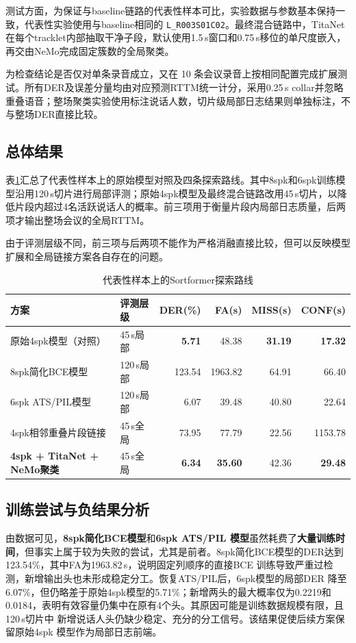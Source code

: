 \documentclass[UTF8,a4paper,10pt]{ctexart}
\begin{document}
测试方面，为保证与baseline链路的代表性样本可比，实验数据与参数基本保持一致，代表性实验使用与baseline相同的 \texttt{L\_R003S01C02}。最终混合链路中，TitaNet在每个tracklet内部抽取干净子段，默认使用1.5\,s窗口和0.75\,s移位的单尺度嵌入，再交由NeMo完成固定簇数的全局聚类。

为检查结论是否仅对单条录音成立，又在 10 条会议录音上按相同配置完成扩展测试。所有DER及误差分量均由对应预测RTTM统一计分，采用0.25\,s collar并忽略重叠语音；整场聚类实验使用标注说话人数，切片级局部日志结果则单独标注，不与整场DER直接比较。





\subsection{总体结果}

表\ref{tab:sortformer-paths}汇总了代表性样本上的原始模型对照及四条探索路线。其中8spk和6spk训练模型沿用120\,s切片进行局部评测；原始4spk模型及最终混合链路改用45\,s切片，以降低片段内超过4名活跃说话人的概率。前三项用于衡量片段内局部日志质量，后两项才输出整场会议的全局RTTM。

由于评测层级不同，前三项与后两项不能作为严格消融直接比较，但可以反映模型扩展和全局链接方案各自存在的问题。

\begin{table}[H]
\centering
\small
\caption{代表性样本上的Sortformer探索路线}
\label{tab:sortformer-paths}
\begin{tabular}{llrrrr}
\toprule
方案 & 评测层级 & DER(\%) & FA(s)& MISS(s)& CONF(s)\\
\midrule
原始4spk模型（对照） & 45\,s局部 & \textbf{5.71} & 48.38 & \textbf{31.19} & \textbf{17.32}\\
8spk简化BCE模型 & 120\,s局部 & 123.54 & 1963.82 & 64.91 & 66.40\\
6spk ATS/PIL模型 & 120\,s局部 & 6.07 & 39.48 & 40.80 & 22.64\\
4spk相邻重叠片段链接 & 45\,s全局 & 73.95 & 77.79 & 22.56 & 1153.78\\
\textbf{4spk + TitaNet + NeMo聚类} & 45\,s全局 & \textbf{6.34} & \textbf{35.60} & 42.36 & \textbf{29.48}\\
\bottomrule
\end{tabular}
\end{table}

\subsection{训练尝试与负结果分析}
由数据可见，\textbf{8spk简化BCE模型}和\textbf{6spk ATS/PIL 模型}虽然耗费了\textbf{大量训练时间}，但事实上属于较为失败的尝试，尤其是前者。8spk简化BCE模型的DER达到123.54\%，其中FA为1963.82\,s，说明固定列顺序的直接BCE
训练导致严重过检测，新增输出头也未形成稳定分工。恢复ATS/PIL后，6spk模型的局部DER
降至6.07\%，但仍略差于原始4spk模型的5.71\%；新增两头的最大概率仅为0.2219和
0.0184，表明有效容量仍集中在原有4个头。其原因可能是训练数据规模有限，且120\,s切片中
新增说话人头仍缺少稳定、充分的分工信号。该结果促使后续方案保留原始4spk
模型作为局部日志前端。
\end{document}
